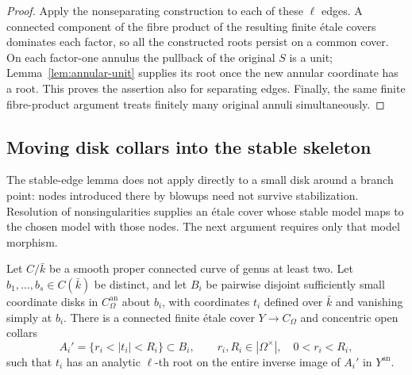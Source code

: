 \begin{proof}
Apply the nonseparating construction to each of these $\ell$ edges.
A connected component of the fibre product of the resulting finite
\'etale covers dominates each factor, so all the constructed roots
persist on a common cover.  On each factor-one annulus the pullback of
the original $S$ is a unit; Lemma~\ref{lem:annular-unit} supplies its root
once the new annular coordinate has a root.  This proves the assertion
also for separating edges.  Finally, the same finite fibre-product
argument treats finitely many original annuli simultaneously.
\end{proof}

\subsection{Moving disk collars into the stable skeleton}

The stable-edge lemma does not apply directly to a small disk around a
branch point: nodes introduced there by blowups need not survive
stabilization.  Resolution of nonsingularities supplies an \'etale
cover whose stable model maps to the chosen model with those nodes.
The next argument requires only that model morphism.

\begin{lemma}\label{lem:etale-collars}
Let $C/\bar k$ be a smooth proper connected curve of genus at least two.
Let $b_1,\ldots,b_s\in C(\bar k)$ be distinct, and let $B_i$ be pairwise
disjoint sufficiently small coordinate disks in $C_\Omega^{\mathrm{an}}$
about $b_i$, with coordinates $t_i$ defined over $\bar k$ and vanishing
simply at $b_i$.  There is a connected finite \'etale cover
$Y\to C_\Omega$ and concentric open collars
\[
 A_i'=\{r_i<|t_i|<R_i\}\subset B_i,\qquad
 r_i,R_i\in|\Omega^\times|,\quad 0<r_i<R_i,
\]
such that $t_i$ has an analytic $\ell$-th root on the entire inverse
image of $A_i'$ in $Y^{\mathrm{an}}$.
\end{lemma}

